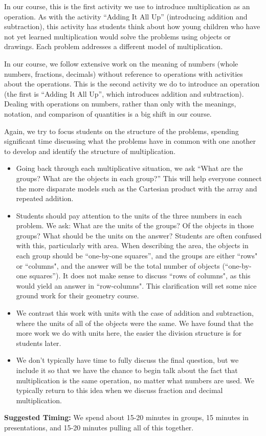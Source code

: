 \documentclass{ximera}
\begin{document}
\newpage
\begin{instructorNotes}
In our course, this is the first activity we use to introduce multiplication as an operation.  As with the activity ``Adding It All Up'' (introducing addition and subtraction), this activity has students think about how young children who have not yet learned multiplication would solve the problems using objects or drawings.  Each problem addresses a different model of multiplication.

In our course, we follow extensive work on the meaning of numbers (whole numbers, fractions, decimals) without reference to operations with activities about the operations.  This is the second activity we do to introduce an operation (the first is ``Adding It All Up'', which introduces addition and subtraction). Dealing with operations on numbers, rather than only with the meanings, notation, and comparison of quantities is a big shift in our course.

Again, we try to focus students on the structure of the problems, spending significant time discussing what the problems have in common with one another to develop and identify the structure of multiplication.

\begin{itemize}
	\item Going back through each multiplicative situation, we ask ``What are the groups? What are the objects in each group?''  This will help everyone connect the more disparate models such as the Cartesian product with the array and repeated addition.  
	\item Students should pay attention to the units of the three numbers in each problem. We ask: What are the units of the groups?  Of the objects in those groups?  What should be the units on the answer?  Students are often confused with this, particularly with area.  When describing the area, the objects in each group should be ``one-by-one squares'', and the groups are either ``rows" or ``columns", and the answer will be the total number of objects (``one-by-one squares''). It does not make sense to discuss ``rows of columns", as this would yield an answer in ``row-columns". This clarification will set some nice ground work for their geometry course.
	\item We contrast this work with units with the case of addition and subtraction, where the units of all of the objects were the same.  We have found that the more work we do with units here, the easier the division structure is for students later.
	\item We don't typically have time to fully discuss the final question, but we include it so that we have the chance to begin talk about the fact that multiplication is the same operation, no matter what numbers are used.  We typically return to this idea when we discuss fraction and decimal multiplication.
\end{itemize}




{\bf Suggested Timing:} We spend about 15-20 minutes in groups, 15 minutes in presentations, and 15-20 minutes pulling all of this together.
\end{instructorNotes}
\end{document}
